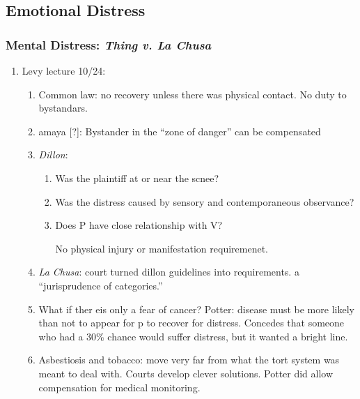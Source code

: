 \subsection{Emotional Distress}

\subsubsection{Mental Distress: \emph{Thing v. La Chusa}}

\begin{enumerate}
    \item Levy lecture 10/24: %
    \begin{enumerate}
        \item Common law: no recovery unless there was physical contact. No duty to bystandars.
        \item amaya [?]: Bystander in the ``zone of danger'' can be compensated
        \item \emph{Dillon}:
        \begin{enumerate}
            \item Was the plaintiff at or near the scnee?
            \item Was the distress caused by sensory and contemporaneous observance?
            \item Does P have close relationship with V?
            \item [No physical injury or manifestation requiremenet.]
        \end{enumerate}
        \item \emph{La Chusa}: court turned dillon guidelines into requirements. a ``jurisprudence of categories.''
        \item What if ther eis only a fear of cancer? Potter: disease must be more likely than not to appear for p to recover for distress. Concedes that someone who had a 30\% chance would suffer distress, but it wanted a bright line.
        \item Asbestiosis and tobacco: move very far from what the tort system was meant to deal with. Courts develop clever solutions. Potter did allow compensation for medical monitoring.
    \end{enumerate}


\end{enumerate}
